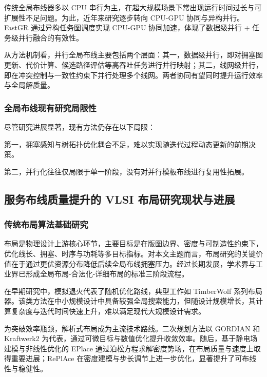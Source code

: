 传统全局布线器多以 CPU 串行为主，在超大规模场景下常出现运行时间过长与可扩展性不足问题。为此，近年来研究逐步转向 CPU-GPU 协同与异构并行。FastGR\cite{10.24963/ijcai.2023/720} 通过异构任务图调度实现 CPU-GPU 协同加速，体现了数据级并行 + 任务级并行融合的有效性。

从方法机制看，并行全局布线主要包括两个层面：其一，数据级并行，即对拥塞图更新、代价计算、候选路径评估等高吞吐任务进行并行映射；其二，线网级并行，即在冲突控制与一致性约束下并行处理多个线网。两者协同有望同时提升运行效率与全局解质量。

\subsubsection{全局布线现有研究局限性}

尽管研究进展显著，现有方法仍存在以下局限：

第一，拥塞感知与树拓扑优化耦合不足，难以实现随迭代过程动态更新的前期决策。

第二，并行化往往仅局限于单一阶段，没有对并行模板布线进行复用性拓展。



\subsection{服务布线质量提升的 VLSI 布局研究现状与进展}

\subsubsection{传统布局算法基础研究}

布局是物理设计上游核心环节，主要目标是在版图边界、密度与可制造性约束下，优化线长、拥塞、时序与功耗等多目标指标。对本文主题而言，布局研究的关键价值在于通过更优资源分布降低后续全局布线拥塞压力。经过长期发展，学术界与工业界已形成全局布局-合法化-详细布局的标准三阶段流程。

在早期研究中，模拟退火代表了随机优化路线，典型工作如 TimberWolf 系列布局器\cite{1586125}。该类方法在中小规模设计中具备较强全局搜索能力，但随设计规模增长，其计算复杂度与迭代时间快速上升，难以满足现代大规模设计需求。

为突破效率瓶颈，解析式布局成为主流技术路线。二次规划方法以 GORDIAN\cite{Kleinhans1991GORDIANVP} 和 Kraftwerk2\cite{10.1109/TCAD.2008.925783} 为代表，通过可微目标与数值优化提升收敛效率。随后，基于静电场建模与非线性优化的 EPlace\cite{10.1145/2699873} 通过泊松方程求解密度势场，在布局质量与速度上取得重要进展；RePlAce\cite{10.1109/TCAD.2018.2859220} 在密度建模与步长调节上进一步优化，显著提升了可布线性与稳健性。

